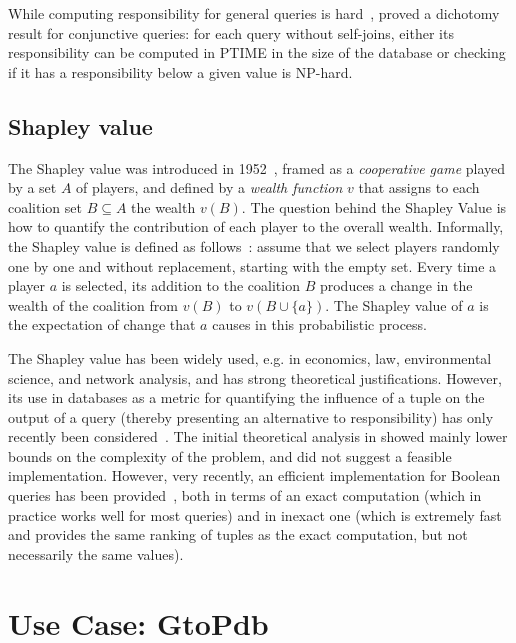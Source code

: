 \documentclass[preprint,12pt,sort&compress]{elsarticle}
\newcommand{\rtwo}[1]{\textcolor{reviewer2}{#1}}
\begin{document}
\rtwo{While computing responsibility for general queries is hard~\cite{ChocklerH04}, \citet{MeliouGMS11} proved a dichotomy result for conjunctive queries: for each query without self-joins, either its responsibility can be computed in PTIME in the size of the database or checking if it has a responsibility below a given value is NP-hard.}

\subsection{Shapley value}
\rtwo{The Shapley value was introduced in 1952~\cite{Shapley1954}, framed as a \emph{cooperative game} played by a set $A$ of players, and defined by a \emph{wealth function} $v$ that assigns to each coalition set $B \subseteq A$ the wealth $v(B)$.
The question behind the Shapley Value is how to quantify the contribution of each player to the overall wealth. 
Informally, the Shapley value is defined as follows~\cite{LivshitsBKS20}: assume that we select players randomly one by one and without replacement, starting with the empty set. Every time a player $a$ is selected, its addition to the coalition $B$ produces a change in the wealth of the coalition from $v(B)$ to $v(B \cup \{a\})$. The Shapley value of $a$ is the expectation of change that $a$ causes in this probabilistic process.}

\rtwo{The Shapley value has been widely used, e.g. in economics, law, environmental science, and network analysis, and has strong theoretical justifications. However, its use in databases as a metric for quantifying the influence of a tuple on the output of a query (thereby presenting an alternative to responsibility)  has only recently been considered~\cite{LivshitsBKS20}. 
The initial theoretical analysis in \cite{LivshitsBKS20} showed mainly lower bounds on the complexity of the problem, and did not suggest a feasible implementation.
However, very recently, an efficient implementation for Boolean queries has been provided~\cite{DFKM22}, both in terms of an exact computation (which in practice works well for most queries) and in inexact one (which is extremely fast and provides the same ranking of tuples as the exact computation, but not necessarily the same values).}


\section{Use Case: GtoPdb}
\label{section:use_case}
\end{document}
